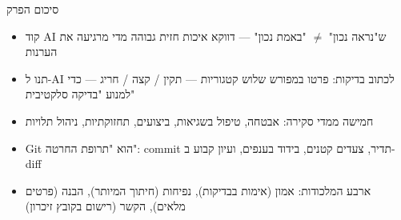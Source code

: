 \begin{tcbsummary}{סיכום הפרק}
\begin{itemize}
  \item קוד AI ש"נראה נכון" $\neq$ "באמת נכון" — דווקא איכות חזית גבוהה מדי מרגיעה את הערנות
  \item תנו ל-AI לכתוב בדיקות: פרטו במפורש שלוש קטגוריות — תקין / קצה / חריג — כדי למנוע "בדיקה סלקטיבית"
  \item חמישה ממדי סקירה: אבטחה, טיפול בשגיאות, ביצועים, תחזוקתיות, ניהול תלויות
  \item Git הוא "תרופת החרטה": commit תדיר, צעדים קטנים, בידוד בענפים, ועיון קבוע ב-diff
  \item ארבע המלכודות: אמון (אימות בבדיקות), נפיחות (חיתוך המיותר), הבנה (פרטים מלאים), הקשר (רישום בקובץ זיכרון)
\end{itemize}

\end{tcbsummary}
